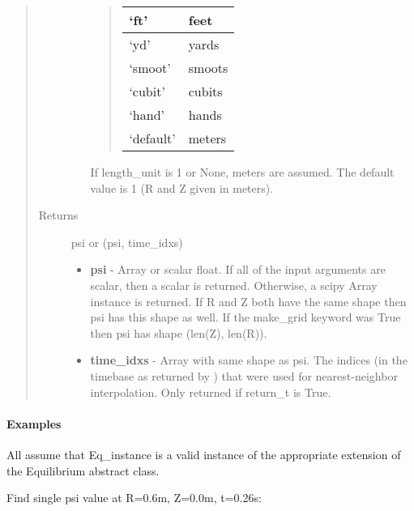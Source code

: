 \documentclass[letterpaper,10pt,english]{sphinxmanual}
\begin{document}
\begin{fulllineitems}
\begin{fulllineitems}
\begin{quote}
\begin{description}
\begin{itemize}
\begin{quote}
\begin{tabulary}{\linewidth}{|L|L|}
`ft'
 & 
feet
\\\hline

`yd'
 & 
yards
\\\hline

`smoot'
 & 
smoots
\\\hline

`cubit'
 & 
cubits
\\\hline

`hand'
 & 
hands
\\\hline

`default'
 & 
meters
\\\hline
\end{tabulary}

\end{quote}

If length\_unit is 1 or None, meters are assumed. The default
value is 1 (R and Z given in meters).

\end{itemize}

\item[{Returns}] \leavevmode

psi or (psi, time\_idxs)
\begin{itemize}
\item {} 
\textbf{psi} - Array or scalar float. If all of the input arguments are scalar,
then a scalar is returned. Otherwise, a scipy Array instance is
returned. If R and Z both have the same shape then psi has this
shape as well. If the make\_grid keyword was True then psi has
shape (len(Z), len(R)).

\item {} 
\textbf{time\_idxs} - Array with same shape as psi. The indices (in the
timebase as returned by {\hyperref[eqtools:eqtools.core.Equilibrium.getTimeBase]{}}) that were used
for nearest-neighbor interpolation. Only returned if return\_t
is True.

\end{itemize}


\end{description}\end{quote}
\paragraph{Examples}

All assume that Eq\_instance is a valid instance of the appropriate
extension of the Equilibrium abstract class.

Find single psi value at R=0.6m, Z=0.0m, t=0.26s:


\end{fulllineitems}
\end{fulllineitems}
\end{document}
